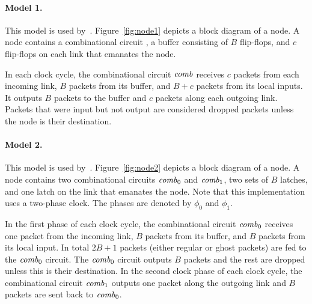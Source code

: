 \documentclass[11pt]{article}
\newenvironment{proof sketch}[1]{\noindent {\emph{Proof sketch of #1:}}}{\hfill \qed}
\begin{document}
\paragraph{Model 1.}
This model is used by~\cite{ARSU,RR}. Figure~\ref{fig:node1}
depicts a block diagram of a node. A node contains a combinational
circuit \comb, a buffer consisting of $B$ flip-flops, and $c$
flip-flops on each  link that emanates the node.

In each clock cycle, the combinational circuit $\text{\emph{comb}}$ receives $c$
packets from each incoming link, $B$ packets from its buffer, and
$B+c$ packets from its local inputs. It outputs $B$ packets to the
buffer and $c$ packets along each outgoing link. Packets that were
input but not output are considered dropped packets unless the node is
their destination.

\paragraph{Model 2.}
This model is used by~\cite{AKK,AZ}. Figure~\ref{fig:node2} depicts a
block diagram of a node. A node contains two combinational circuits
$\text{\emph{comb}}_0$ and $\text{\emph{comb}}_1$, two sets of $B$ latches, and one latch
on the link that emanates the node. Note that this implementation uses a
two-phase clock. The phases are denoted by $\phi_0$ and $\phi_1$.

In the first phase of each clock cycle, the combinational circuit $\text{\emph{comb}}_0$ receives
one packet from the incoming link, $B$ packets from its buffer, and $B$ packets from its
local input. In total $2B+1$ packets (either regular or ghost packets) are fed to the
$\text{\emph{comb}}_0$ circuit. The $\text{\emph{comb}}_0$ circuit outputs $B$ packets and the rest are dropped
unless this is their destination.  In the
second clock phase of each clock cycle, the combinational circuit $\text{\emph{comb}}_1$ outputs
one packet along the outgoing link and $B$ packets are sent back to $\text{\emph{comb}}_0$.
\end{document}
